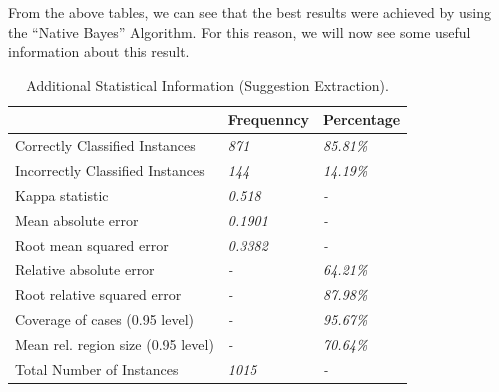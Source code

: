 From the above tables, we can see that the best results were achieved by using the ``Native Bayes'' Algorithm. For this reason, we will now see some useful information about this result.

\begin{table}[H]
\centering
\caption{Additional Statistical Information (Suggestion Extraction).}
\label{48_table_rer}
\begin{tabular}{lll}
\hline
                                   & {\bf Frequenncy} & {\bf Percentage} \\ \hline
Correctly Classified Instances     & {\it 871}        & {\it 85.81\%}    \\
Incorrectly Classified Instances   & {\it 144}        & {\it 14.19\%}    \\
Kappa statistic                    & {\it 0.518}      & {\it -}          \\
Mean absolute error                & {\it 0.1901}     & {\it -}          \\
Root mean squared error            & {\it 0.3382}     & {\it -}          \\
Relative absolute error            & {\it -}          & {\it 64.21\%}    \\
Root relative squared error        & {\it -}          & {\it 87.98\%}    \\
Coverage of cases (0.95 level)     & {\it -}          & {\it 95.67\%}    \\
Mean rel. region size (0.95 level) & {\it -}          & {\it 70.64\%}    \\
Total Number of Instances          & {\it 1015}       & {\it -}          \\ \hline
\end{tabular}
\end{table}



